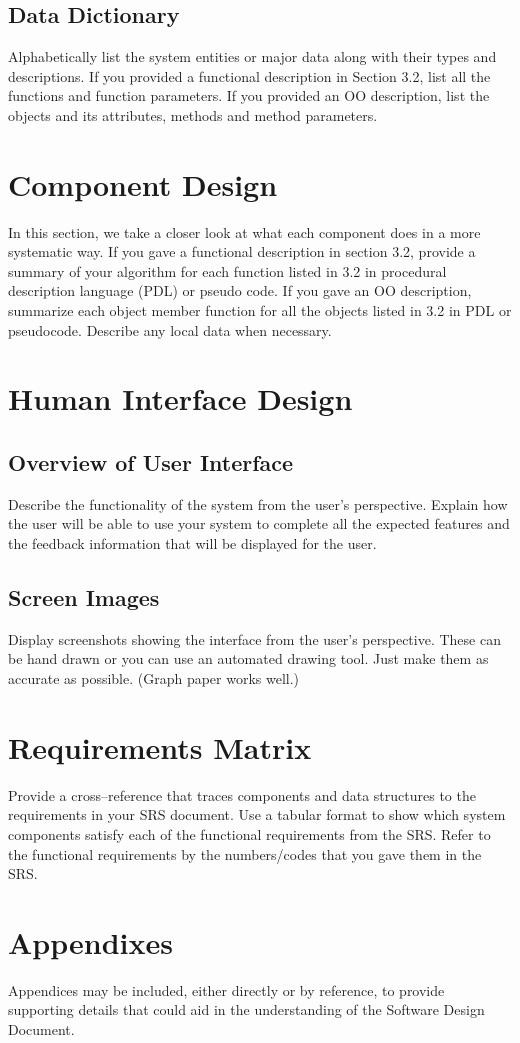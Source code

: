 \documentclass[journal,10pt,onecolumn,compsoc]{IEEEtran}
\begin{document}
    \subsection{Data Dictionary}
    Alphabetically list the system entities or major data along with their types and
    descriptions. If you provided a functional description in Section 3.2, list all the
    functions and function parameters. If you provided an OO description, list the objects
    and its attributes, methods and method parameters.
    \section{Component Design}
    In this section, we take a closer look at what each component does in a more
    systematic way. If you gave a functional description in section 3.2, provide a
    summary of your algorithm for each function listed in 3.2 in procedural description
    language (PDL) or pseudo code. If you gave an OO description, summarize each
    object member function for all the objects listed in 3.2 in PDL or pseudocode.
    Describe any local data when necessary. 
    \section{Human Interface Design}
    \subsection{Overview of User Interface}
    Describe the functionality of the system from the user’s perspective. Explain how the
    user will be able to use your system to complete all the expected features and the
    feedback information that will be displayed for the user.
    \subsection{Screen Images}
    Display screenshots showing the interface from the user’s perspective. These can be
    hand drawn or you can use an automated drawing tool. Just make them as accurate
    as possible. (Graph paper works well.) 
    \section{Requirements Matrix}
    Provide a cross--reference that traces components and data structures to the
    requirements in your SRS document.
    Use a tabular format to show which system components satisfy each of the functional
    requirements from the SRS. Refer to the functional requirements by the
    numbers/codes that you gave them in the SRS. 
    \section{Appendixes}
    Appendices may be included, either directly or by reference, to provide supporting details
    that could aid in the understanding of the Software Design Document. 
    
    
\end{document}

